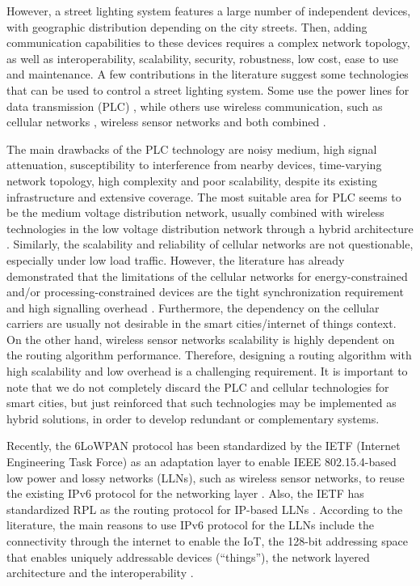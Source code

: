 \documentclass[final,authoryear,3p,twocolumn]{elsarticle}
\begin{document}
However, a street lighting system features a large number of independent devices, with geographic distribution depending on the city streets. Then, adding communication capabilities to these devices requires a complex network topology, as well as interoperability, scalability, security, robustness, low cost, ease to use and maintenance. A few contributions in the literature suggest some technologies that can be used to control a street lighting system. Some use the power lines for data transmission (PLC) \citep{PLC_Street_Lighting_2003,PLC_Street_Lighting_2006}, while others use wireless communication, such as cellular networks \citep{Cellular_Street_Lighting_2009_1,Cellular_Street_Lighting_2010_1}, wireless sensor networks \citep{WSN_Street_Lighting_2010_1, WSN_Street_Lighting_2010_2} and both combined \citep{WSN_Street_lighting_2006, WSN_Street_lighting_2007}.

The main drawbacks of the PLC technology are noisy medium, high signal attenuation, susceptibility to interference from nearby devices, time-varying network topology, high complexity and poor scalability, despite its existing infrastructure and extensive coverage. The most suitable area for PLC seems to be the medium voltage distribution network, usually combined with wireless technologies in the low voltage distribution network through a hybrid architecture \citep{PLC_drawbacks}. Similarly, the scalability and reliability of cellular networks are not questionable, especially under low load traffic. However, the literature has already demonstrated that the limitations of the cellular networks for energy-constrained and/or processing-constrained devices are the tight synchronization requirement and high signalling overhead \citep{celullar_iot}. Furthermore, the dependency on the cellular carriers are usually not desirable in the smart cities/internet of things context. On the other hand, wireless sensor networks scalability is highly dependent on the routing algorithm performance. Therefore, designing a routing algorithm with high scalability and low overhead is a challenging requirement. It is important to note that we do not completely discard the PLC and cellular technologies for smart cities, but just reinforced that such technologies may be implemented as hybrid solutions, in order to develop redundant or complementary systems.

Recently, the 6LoWPAN protocol has been standardized by the IETF (Internet Engineering Task Force) as an adaptation layer to enable IEEE 802.15.4-based low power and lossy networks (LLNs), such as wireless sensor networks, to reuse the existing IPv6 protocol for the networking layer \citep{RFC4944}. Also, the IETF has standardized RPL as the routing protocol for IP-based LLNs \citep{RFC6550}. According to the literature, the main reasons to use IPv6 protocol for the LLNs include the connectivity through the internet to enable the IoT, the 128-bit addressing space that enables uniquely addressable devices (``things''), the network layered architecture and the interoperability \citep{IPv6_LLN_2010, IPv6_LLN_2011, Smart_City_IOT_2014b}.
\end{document}
